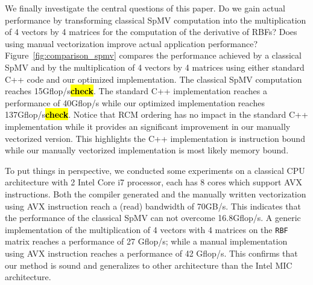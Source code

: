 \documentclass[10pt,conference,compsocconf]{IEEEtran}
\newcommand{\todo}[1]{{\color{red}\textbf{\hl{#1}}\xspace}}
\begin{document}
We finally investigate the central questions of this paper. Do we gain
actual performance by transforming classical SpMV computation into the
multiplication of 4 vectors by 4 matrices for the computation of the
derivative of RBFs? Does using manual vectorization improve actual
application performance? Figure~\ref{fig:comparison_spmv} compares the
performance achieved by a classical SpMV and by the multiplication of
4 vectors by 4 matrices using either standard C++ code and our
optimized implementation. The
classical SpMV computation reaches 15Gflop/s\todo{check}. The standard
C++ implementation reaches a performance of 40Gflop/s while our
optimized implementation reaches 137Gflop/s\todo{check}. Notice that
RCM ordering has no impact in the standard C++ implementation while it
provides an significant improvement in our manually vectorized
version. This highlights the C++ implementation is instruction bound
while our manually vectorized implementation is most likely memory
bound. 

To put things in perspective, we conducted some experiments on a
classical CPU architecture with 2 Intel Core i7 processor, each has 8
cores which support AVX instructions. Both the compiler generated and
the manually written vectorization using AVX instruction reach a
(read) bandwidth of 70GB/s. This indicates that the performance of the
classical SpMV can not overcome 16.8Gflop/s. A generic implementation
of the multiplication of 4 vectors with 4 matrices on the {\tt RBF}
matrix reaches a performance of 27 Gflop/s; while a manual
implementation using AVX instruction reaches a performance of 42
Gflop/s. This confirms that our method is sound and generalizes to
other architecture than the Intel MIC architecture.


\end{document}
